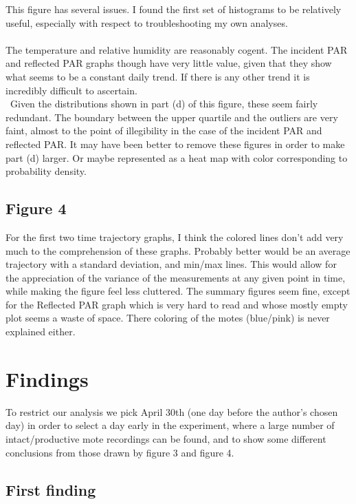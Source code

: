\documentclass[english]{article}\usepackage[]{graphicx}\usepackage[]{color}
\begin{document}
This figure has several issues.  I found the first set of histograms to be relatively
useful, especially with respect to troubleshooting my own analyses.\\\\
The temperature and relative humidity are reasonably cogent.  The incident PAR and 
reflected PAR graphs though have very little value, given that they show
what seems to be a constant daily trend.  If there is any other trend it is
incredibly difficult to ascertain.\\\
Given the distributions shown in part (d) of this figure, these seem fairly redundant.
The boundary between the upper quartile and the outliers are very faint, almost to the
point of illegibility in the case of the incident PAR and reflected PAR.  It may have
been better to remove these figures in order to make part (d) larger.  Or maybe represented
as a heat map with color corresponding to probability density.

\subsection{Figure 4}

For the first two time trajectory graphs, I think the colored lines don't
add very much to the comprehension of these graphs.  Probably better would be
an average trajectory with a standard deviation, and min/max lines.  This would
allow for the appreciation of the variance of the measurements at any given point
in time, while making the figure feel less cluttered.  The summary figures seem fine,
except for the Reflected PAR graph which is very hard to read and whose mostly empty
plot seems a waste of space.  There coloring of the motes (blue/pink) is never explained
either.

\section{Findings}

To restrict our analysis we pick April 30th (one day before the author's chosen day)
in order to select a day early in the experiment, where a large number of intact/productive
mote recordings can be found, and to show some different conclusions from those drawn
by figure 3 and figure 4.

\subsection{First finding}
\end{document}
